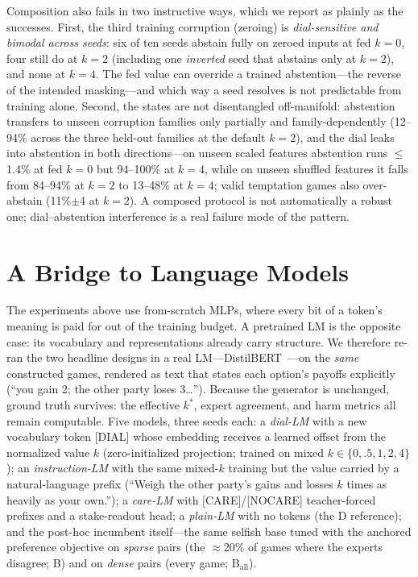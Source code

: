 \documentclass[11pt]{article}
\begin{document}
Composition also fails in two instructive ways, which we report as plainly as the successes. First, the third training corruption (zeroing) is \emph{dial-sensitive and bimodal across seeds}: six of ten seeds abstain fully on zeroed inputs at fed $k{=}0$, four still do at $k{=}2$ (including one \emph{inverted} seed that abstains only at $k{=}2$), and none at $k{=}4$. The fed value can override a trained abstention---the reverse of the intended masking---and which way a seed resolves is not predictable from training alone. Second, the states are not disentangled off-manifold: abstention transfers to unseen corruption families only partially and family-dependently (12--94\% across the three held-out families at the default $k{=}2$), and the dial leaks into abstention in both directions---on unseen scaled features abstention runs $\leq$1.4\% at fed $k{=}0$ but 94--100\% at $k{=}4$, while on unseen shuffled features it falls from 84--94\% at $k{=}2$ to 13--48\% at $k{=}4$; valid temptation games also over-abstain (11\%$\pm$4 at $k{=}2$). A composed protocol is not automatically a robust one; dial--abstention interference is a real failure mode of the pattern.

\section{A Bridge to Language Models}
\label{sec:bridge}

The experiments above use from-scratch MLPs, where every bit of a token's meaning is paid for out of the training budget. A pretrained LM is the opposite case: its vocabulary and representations already carry structure. We therefore re-ran the two headline designs in a real LM---DistilBERT~\cite{sanh2019distilbert}---on the \emph{same} constructed games, rendered as text that states each option's payoffs explicitly (``you gain 2; the other party loses 3\ldots''). Because the generator is unchanged, ground truth survives: the effective $k^*$, expert agreement, and harm metrics all remain computable. Five models, three seeds each: a \emph{dial-LM} with a new vocabulary token [DIAL] whose embedding receives a learned offset from the normalized value $k$ (zero-initialized projection; trained on mixed $k \in \{0,.5,1,2,4\}$); an \emph{instruction-LM} with the same mixed-$k$ training but the value carried by a natural-language prefix (``Weigh the other party's gains and losses $k$ times as heavily as your own.''); a \emph{care-LM} with [CARE]/[NOCARE] teacher-forced prefixes and a stake-readout head; a \emph{plain-LM} with no tokens (the D reference); and the post-hoc incumbent itself---the same selfish base tuned with the anchored preference objective on \emph{sparse} pairs (the $\approx$20\% of games where the experts disagree; B) and on \emph{dense} pairs (every game; B$_{\mathrm{all}}$).
\end{document}
